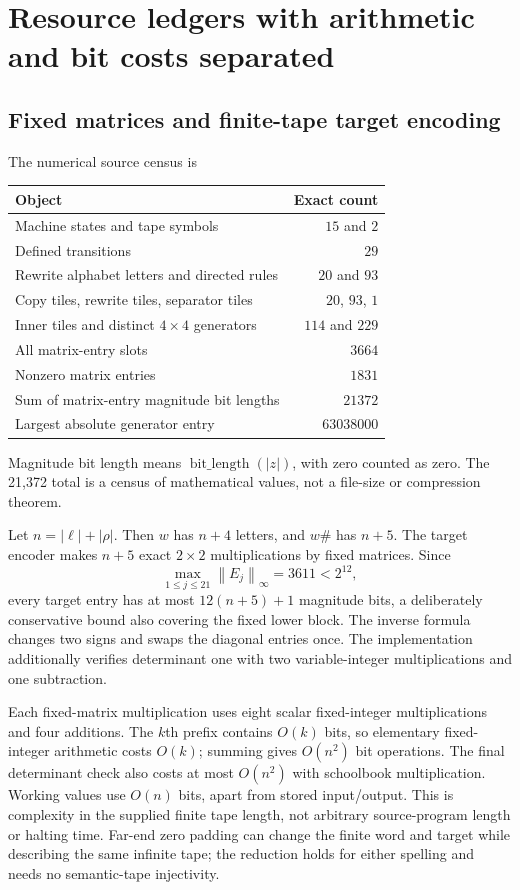 \documentclass[11pt,letterpaper]{article}
\theoremstyle{definition}
\theoremstyle{remark}
\newcommand{\umnorm}[1]{\left\lVert #1\right\rVert_\infty}
\begin{document}
\section{Resource ledgers with arithmetic and bit costs separated}
\label{gts:um:sec:resources}
\subsection{Fixed matrices and finite-tape target encoding}
The numerical source census is
\begin{center}
\begin{tabular}{lr}\toprule
Object & Exact count\\\midrule
Machine states and tape symbols & $15$ and $2$\\
Defined transitions & $29$\\
Rewrite alphabet letters and directed rules & $20$ and $93$\\
Copy tiles, rewrite tiles, separator tiles & $20$, $93$, $1$\\
Inner tiles and distinct $4\times4$ generators & $114$ and $229$\\
All matrix-entry slots & $3664$\\
Nonzero matrix entries & $1831$\\
Sum of matrix-entry magnitude bit lengths & $21372$\\
Largest absolute generator entry & $63038000$\\\bottomrule
\end{tabular}
\end{center}
Magnitude bit length means $\operatorname{bit\_length}(|z|)$, with zero counted as zero. The 21,372 total is a census of mathematical values, not a file-size or compression theorem.

Let $n=|\ell|+|\rho|$. Then $w$ has $n+4$ letters, and $w\#$ has $n+5$. The target encoder makes $n+5$ exact $2\times2$ multiplications by fixed matrices. Since
\[
 \max_{1\leq j\leq21}\umnorm{E_j}=3611<2^{12},
\]
every target entry has at most $12(n+5)+1$ magnitude bits, a deliberately conservative bound also covering the fixed lower block. The inverse formula changes two signs and swaps the diagonal entries once. The implementation additionally verifies determinant one with two variable-integer multiplications and one subtraction.

Each fixed-matrix multiplication uses eight scalar fixed-integer multiplications and four additions. The $k$th prefix contains $O(k)$ bits, so elementary fixed-integer arithmetic costs $O(k)$; summing gives $O(n^2)$ bit operations. The final determinant check also costs at most $O(n^2)$ with schoolbook multiplication. Working values use $O(n)$ bits, apart from stored input/output. This is complexity in the supplied finite tape length, not arbitrary source-program length or halting time. Far-end zero padding can change the finite word and target while describing the same infinite tape; the reduction holds for either spelling and needs no semantic-tape injectivity.
\end{document}
